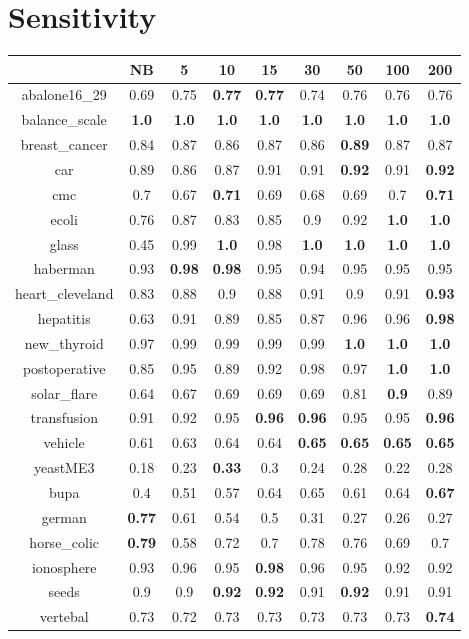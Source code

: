 \documentclass{article}%
\begin{document}
%
\section*{Sensitivity}%
\begin{tabular}{c|cccccccc}%
\hline%
&NB&5&10&15&30&50&100&200\\%
\hline%
abalone16\_29&0.69&0.75&\textbf{0.77}&\textbf{0.77}&0.74&0.76&0.76&0.76\\%
\hline%
balance\_scale&\textbf{1.0}&\textbf{1.0}&\textbf{1.0}&\textbf{1.0}&\textbf{1.0}&\textbf{1.0}&\textbf{1.0}&\textbf{1.0}\\%
\hline%
breast\_cancer&0.84&0.87&0.86&0.87&0.86&\textbf{0.89}&0.87&0.87\\%
\hline%
car&0.89&0.86&0.87&0.91&0.91&\textbf{0.92}&0.91&\textbf{0.92}\\%
\hline%
cmc&0.7&0.67&\textbf{0.71}&0.69&0.68&0.69&0.7&\textbf{0.71}\\%
\hline%
ecoli&0.76&0.87&0.83&0.85&0.9&0.92&\textbf{1.0}&\textbf{1.0}\\%
\hline%
glass&0.45&0.99&\textbf{1.0}&0.98&\textbf{1.0}&\textbf{1.0}&\textbf{1.0}&\textbf{1.0}\\%
\hline%
haberman&0.93&\textbf{0.98}&\textbf{0.98}&0.95&0.94&0.95&0.95&0.95\\%
\hline%
heart\_cleveland&0.83&0.88&0.9&0.88&0.91&0.9&0.91&\textbf{0.93}\\%
\hline%
hepatitis&0.63&0.91&0.89&0.85&0.87&0.96&0.96&\textbf{0.98}\\%
\hline%
new\_thyroid&0.97&0.99&0.99&0.99&0.99&\textbf{1.0}&\textbf{1.0}&\textbf{1.0}\\%
\hline%
postoperative&0.85&0.95&0.89&0.92&0.98&0.97&\textbf{1.0}&\textbf{1.0}\\%
\hline%
solar\_flare&0.64&0.67&0.69&0.69&0.69&0.81&\textbf{0.9}&0.89\\%
\hline%
transfusion&0.91&0.92&0.95&\textbf{0.96}&\textbf{0.96}&0.95&0.95&\textbf{0.96}\\%
\hline%
vehicle&0.61&0.63&0.64&0.64&\textbf{0.65}&\textbf{0.65}&\textbf{0.65}&\textbf{0.65}\\%
\hline%
yeastME3&0.18&0.23&\textbf{0.33}&0.3&0.24&0.28&0.22&0.28\\%
\hline%
bupa&0.4&0.51&0.57&0.64&0.65&0.61&0.64&\textbf{0.67}\\%
\hline%
german&\textbf{0.77}&0.61&0.54&0.5&0.31&0.27&0.26&0.27\\%
\hline%
horse\_colic&\textbf{0.79}&0.58&0.72&0.7&0.78&0.76&0.69&0.7\\%
\hline%
ionosphere&0.93&0.96&0.95&\textbf{0.98}&0.96&0.95&0.92&0.92\\%
\hline%
seeds&0.9&0.9&\textbf{0.92}&\textbf{0.92}&0.91&\textbf{0.92}&0.91&0.91\\%
\hline%
vertebal&0.73&0.72&0.73&0.73&0.73&0.73&0.73&\textbf{0.74}\\%
\hline%
\end{tabular}
\end{document}
